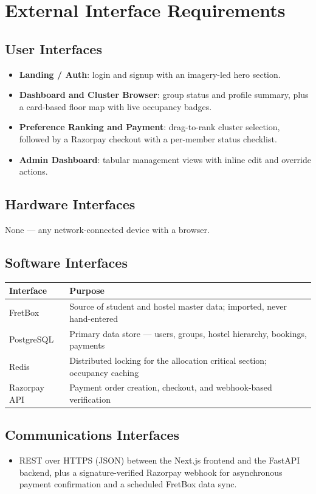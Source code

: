 \documentclass[11pt]{report}
\begin{document}
\chapter{External Interface Requirements}

\section{User Interfaces}
\begin{itemize}[leftmargin=1.2cm]
    \item \textbf{Landing / Auth}: login and signup with an imagery-led hero section.
    \item \textbf{Dashboard and Cluster Browser}: group status and profile summary, plus a card-based floor map with live occupancy badges.
    \item \textbf{Preference Ranking and Payment}: drag-to-rank cluster selection, followed by a Razorpay checkout with a per-member status checklist.
    \item \textbf{Admin Dashboard}: tabular management views with inline edit and override actions.
\end{itemize}

\section{Hardware Interfaces}
None --- any network-connected device with a browser.

\section{Software Interfaces}
\begin{longtable}{p{3.2cm}p{10.5cm}}
\toprule
\textbf{Interface} & \textbf{Purpose} \\
\midrule
FretBox & Source of student and hostel master data; imported, never hand-entered \\
PostgreSQL & Primary data store --- users, groups, hostel hierarchy, bookings, payments \\
Redis & Distributed locking for the allocation critical section; occupancy caching \\
Razorpay API & Payment order creation, checkout, and webhook-based verification \\
\bottomrule
\end{longtable}

\section{Communications Interfaces}
\begin{itemize}[leftmargin=1.2cm]
    \item REST over HTTPS (JSON) between the Next.js frontend and the FastAPI backend, plus a signature-verified Razorpay webhook for asynchronous payment confirmation and a scheduled FretBox data sync.
\end{itemize}
\end{document}
